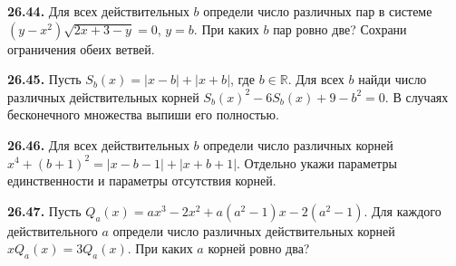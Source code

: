 \noindent\begin{minipage}[t]{\linewidth}\textbf{26.44.}\starmark{} Для всех действительных \(b\) определи число различных пар в системе \((y-x^2)\sqrt{2x+3-y}=0\), \(y=b\). При каких \(b\) пар ровно две? Сохрани ограничения обеих ветвей.\par\end{minipage}\par
\noindent\begin{minipage}[t]{\linewidth}\textbf{26.45.}\starmark{} Пусть \(S_b(x)=|x-b|+|x+b|\), где \(b\in\mathbb R\). Для всех \(b\) найди число различных действительных корней \(S_b(x)^2-6S_b(x)+9-b^2=0\). В случаях бесконечного множества выпиши его полностью.\par\end{minipage}\par
\noindent\begin{minipage}[t]{\linewidth}\textbf{26.46.}\starmark{} Для всех действительных \(b\) определи число различных корней \(x^4+(b+1)^2=|x-b-1|+|x+b+1|\). Отдельно укажи параметры единственности и параметры отсутствия корней.\par\end{minipage}\par
\noindent\begin{minipage}[t]{\linewidth}\textbf{26.47.}\starmark{} Пусть \(Q_a(x)=ax^3-2x^2+a(a^2-1)x-2(a^2-1)\). Для каждого действительного \(a\) определи число различных действительных корней \(xQ_a(x)=3Q_a(x)\). При каких \(a\) корней ровно два?\par\end{minipage}\par
\endgroup
